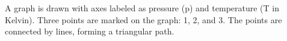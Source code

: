 A graph is drawn with axes labeled as pressure (p) and temperature (T in Kelvin). Three points are marked on the graph: 1, 2, and 3. The points are connected by lines, forming a triangular path.